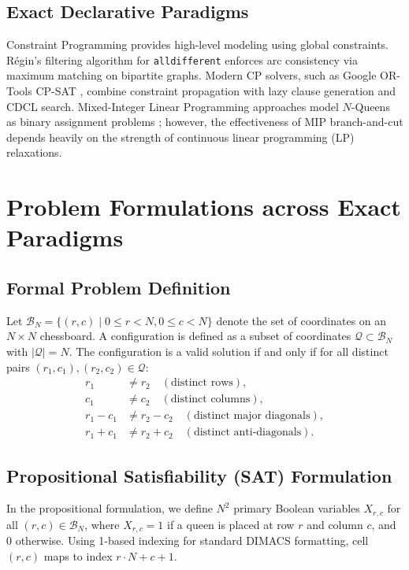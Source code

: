 \documentclass[a4paper,fleqn]{cas-sc}
\begin{document}
\subsection{Exact Declarative Paradigms}
Constraint Programming provides high-level modeling using global constraints. Régin's filtering algorithm for \texttt{alldifferent} \citep{regin1994filtering} enforces arc consistency via maximum matching on bipartite graphs. Modern CP solvers, such as Google OR-Tools CP-SAT \citep{google2024ortools}, combine constraint propagation with lazy clause generation and CDCL search. Mixed-Integer Linear Programming approaches model $N$-Queens as binary assignment problems \citep{gurobi2025, ibm2022cplex}; however, the effectiveness of MIP branch-and-cut depends heavily on the strength of continuous linear programming (LP) relaxations.

\section{Problem Formulations across Exact Paradigms}
\label{sec:formulations}

\subsection{Formal Problem Definition}
Let $\mathcal{B}_N = \{(r, c) \mid 0 \le r < N, 0 \le c < N\}$ denote the set of coordinates on an $N \times N$ chessboard. A configuration is defined as a subset of coordinates $\mathcal{Q} \subset \mathcal{B}_N$ with $|\mathcal{Q}| = N$. The configuration is a valid solution if and only if for all distinct pairs $(r_1, c_1), (r_2, c_2) \in \mathcal{Q}$:
\begin{align}
    r_1 &\ne r_2 \quad (\text{distinct rows}), \\
    c_1 &\ne c_2 \quad (\text{distinct columns}), \\
    r_1 - c_1 &\ne r_2 - c_2 \quad (\text{distinct major diagonals}), \\
    r_1 + c_1 &\ne r_2 + c_2 \quad (\text{distinct anti-diagonals}).
\end{align}

\subsection{Propositional Satisfiability (SAT) Formulation}
In the propositional formulation, we define $N^2$ primary Boolean variables $X_{r, c}$ for all $(r, c) \in \mathcal{B}_N$, where $X_{r, c} = 1$ if a queen is placed at row $r$ and column $c$, and $0$ otherwise. Using 1-based indexing for standard DIMACS formatting, cell $(r, c)$ maps to index $r \cdot N + c + 1$.
\end{document}
